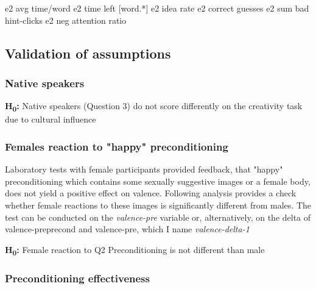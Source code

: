 	e2 avg time/word 
	 e2 time left [word.*]  
	  e2 idea rate 
	   e2 correct guesses
	e2 sum bad hint-clicks 
	 e2 neg attention ratio
	
	
	
	
	\subsection{Validation of assumptions} \label{sec:data-validity}
	
		\subsubsection{Native speakers} 
		\textbf{H\textsubscript{0}:}  Native speakers (Question 3) do not score differently on the creativity task due to cultural influence 
		
		\subsubsection{Females reaction to "happy" preconditioning}
		
		Laboratory tests with female participants provided feedback, that "happy" preconditioning which contains some sexually suggestive images or a female body, does not yield a positive effect on valence. Following analysis provides a check whether female reactions to these images is significantly different from males. The test can be conducted on the \textit{valence-pre} variable or, alternatively, on the delta of valence-preprecond and valence-pre, which I name \textit{valence-delta-1}
		 
		\textbf{H\textsubscript{0}:} Female reaction to Q2 Preconditioning is not different than male
		
		
		
		\subsubsection{Preconditioning effectiveness}
		

